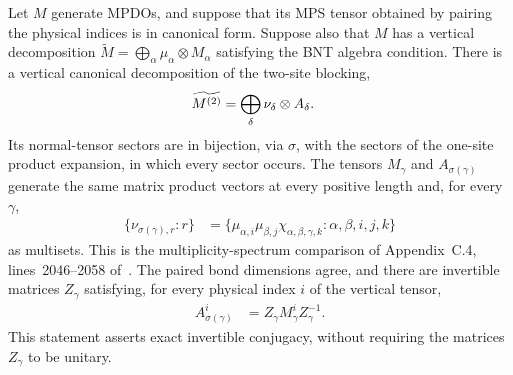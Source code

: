 \begin{lemma}%
    \label{thm:mpdo_bnt_algebra_tensor_clause_spectrum}
    \leanok
    Let $M$ generate MPDOs, and suppose that its MPS tensor obtained by
    pairing the physical indices is in canonical form. Suppose also that $M$ has a
    vertical decomposition
    $\widetilde M=\bigoplus_\alpha \mu_\alpha\otimes M_\alpha$
    satisfying the BNT algebra condition.
    There is a vertical canonical decomposition of the two-site blocking,
    \begin{align}
        \widetilde{M^{(2)}}
         & =\bigoplus_\delta \nu_\delta\otimes A_\delta.
        \notag
    \end{align}
    Its normal-tensor sectors are in bijection, via $\sigma$, with the sectors
    of the one-site product expansion, in which every sector occurs.
    The tensors $M_\gamma$ and $A_{\sigma(\gamma)}$ generate the same matrix
    product vectors at every positive length and, for every $\gamma$,
    \begin{align}
        \bigl\{\nu_{\sigma(\gamma),r}:r\bigr\}
         & =
        \bigl\{\mu_{\alpha,i}\mu_{\beta,j}
        \chi_{\alpha,\beta,\gamma,k}:\alpha,\beta,i,j,k\bigr\}
        \label{eq:rfp_multiplicity_spectrum}
    \end{align}
    as multisets. This is the multiplicity-spectrum comparison of
    Appendix~C.4, lines~2046--2058
    of~\cite{Cirac2016MPDO_arXiv}. The paired bond dimensions agree,
    and there are invertible matrices $Z_\gamma$ satisfying, for every
    physical index $i$ of the vertical tensor,
    \begin{align}
        A_{\sigma(\gamma)}^i
         & =Z_\gamma M_\gamma^i Z_\gamma^{-1}.
        \label{eq:rfp_sector_conjugacy}
    \end{align}
    This statement asserts exact invertible conjugacy, without requiring
    the matrices $Z_\gamma$ to be unitary.
\end{lemma}

